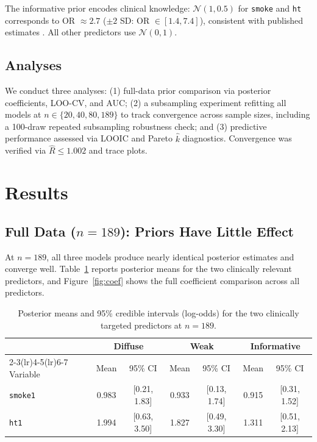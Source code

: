 \documentclass[11pt]{article}
\begin{document}
The informative prior encodes clinical knowledge: $\mathcal{N}(1, 0.5)$
for \texttt{smoke} and \texttt{ht} corresponds to OR $\approx 2.7$
($\pm 2$ SD: OR $\in [1.4, 7.4]$), consistent with published estimates
\cite{Simpson1957,Shah2000}. All other predictors use $\mathcal{N}(0,1)$.

\subsection{Analyses}

We conduct three analyses: (1) full-data prior comparison via
posterior coefficients, LOO-CV, and AUC; (2) a subsampling experiment
refitting all models at $n \in \{20, 40, 80, 189\}$ to track
convergence across sample sizes, including a 100-draw repeated
subsampling robustness check; and (3) predictive performance assessed
via LOOIC and Pareto $\hat{k}$ diagnostics.
Convergence was verified via $\hat{R} \leq 1.002$ and trace plots.

\section{Results}

\subsection{Full Data ($n = 189$): Priors Have Little Effect}

At $n = 189$, all three models produce nearly identical posterior
estimates and converge well.
Table~\ref{tab:coef} reports posterior means for the two clinically
relevant predictors, and Figure~\ref{fig:coef} shows the full
coefficient comparison across all predictors.

\begin{table}[H]
\centering
\begin{tabular}{lcccccc}
\toprule
 & \multicolumn{2}{c}{Diffuse} & \multicolumn{2}{c}{Weak} & \multicolumn{2}{c}{Informative} \\
\cmidrule(lr){2-3}\cmidrule(lr){4-5}\cmidrule(lr){6-7}
Variable & Mean & 95\% CI & Mean & 95\% CI & Mean & 95\% CI \\
\midrule
\texttt{smoke1} & 0.983 & [0.21, 1.83] & 0.933 & [0.13, 1.74] & 0.915 & [0.31, 1.52] \\
\texttt{ht1}    & 1.994 & [0.63, 3.50] & 1.827 & [0.49, 3.30] & 1.311 & [0.51, 2.13] \\
\bottomrule
\end{tabular}
\caption{Posterior means and 95\% credible intervals (log-odds) for the two clinically targeted
predictors at $n = 189$.}
\label{tab:coef}
\end{table}
\end{document}
